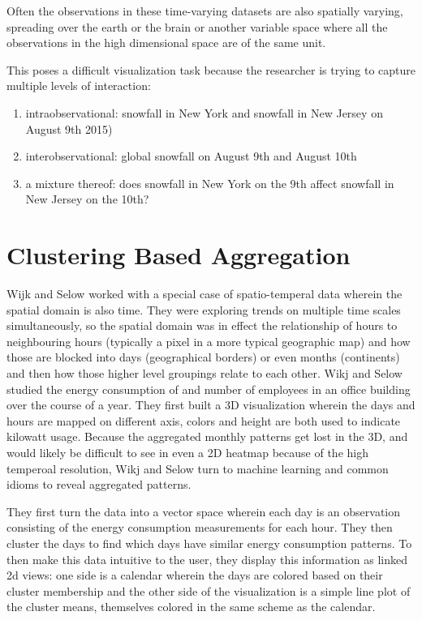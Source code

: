 \documentclass[letterpaper,onecolumn,titlepage]{Ythesis}
\begin{document}
Often the observations in these time-varying datasets are also spatially varying, spreading over the earth or the brain or another variable space where all the observations in the high dimensional space are of the same unit. %

This poses a difficult visualization task because the researcher is trying to capture multiple levels of interaction:
\begin{enumerate}
	\item intraobservational: snowfall in New York and snowfall in New Jersey on August 9th 2015)
	\item interobservational: global snowfall on August 9th and August 10th
	\item a mixture thereof: does snowfall in New York on the 9th affect snowfall in New Jersey on the 10th?
\end{enumerate}


\section{Clustering Based Aggregation}
\label{sec:clustering}
Wijk and Selow \cite{WijkSelow99} worked with a special case of spatio-temperal data wherein the spatial domain is also time. They were exploring trends on multiple time scales simultaneously, so the spatial domain was in effect the relationship of hours to neighbouring hours (typically a pixel in a more typical geographic map) and how those are blocked into days (geographical borders) or even months (continents) and then how those higher level groupings relate to each other. 
Wikj and Selow studied the energy consumption of and number of employees in an office building over the course of a year. They first built a 3D visualization %
wherein the days and hours are mapped on different axis, colors and height are both used to indicate kilowatt usage. Because the aggregated monthly patterns get lost in the 3D, and would likely be difficult to see in even a 2D heatmap because of the high temperoal resolution, Wikj and Selow turn to machine learning and common idioms to reveal aggregated patterns. 

They first turn the data into a vector space wherein each day is an observation consisting of the energy consumption measurements for each hour. They then cluster the days to find which days have similar energy consumption patterns. To then make this data intuitive to the user, they display this information as linked 2d views: one side is a calendar wherein the days are colored based on their cluster membership and the other side of the visualization is a simple line plot of the cluster means, themselves colored in the same scheme as the calendar. %
\end{document}
